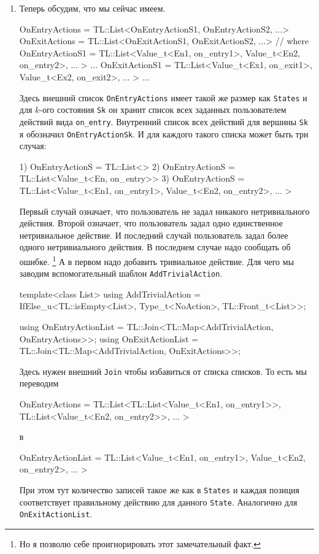 \documentclass{article}
\begin{document}
{\begin{enumerate}
\item Теперь обсудим, что мы сейчас имеем.
\begin{cppcode}[\nonumbers]
OnEntryActions = TL::List<OnEntryActionS1, OnEntryActionS2, ...>
OnExitActions =  TL::List<OnExitActionS1, OnExitActionS2, ...>
// where
OnEntryActionS1 = TL::List<Value_t<En1, on_entry1>,
                           Value_t<En2, on_entry2>,
                           ... >
...
OnExitActionS1 =  TL::List<Value_t<Ex1, on_exit1>,
                           Value_t<Ex2, on_exit2>,
                           ... >
...
\end{cppcode}
Здесь внешний список \verb"OnEntryActions" имеет такой же размер как \verb"States" и для $k$-ого состояния \verb"Sk" он хранит список всех заданных пользователем действий вида \verb"on_entry".
Внутренний список всех действий для вершины \verb"Sk" я обозначил \verb"OnEntryActionSk".
И для каждого такого списка может быть три случая:
\begin{cppcode}[\nonumbers]
1) OnEntryActionS = TL::List<>
2) OnEntryActionS = TL::List<Value_t<En, on_entry>>
3) OnEntryActionS = TL::List<Value_t<En1, on_entry1>,
                             Value_t<En2, on_entry2>,
                             ... >
\end{cppcode}
Первый случай означает, что пользователь не задал никакого нетривиального действия.
Второй означает, что пользователь задал одно единственное нетривиальное действие.
И последний случай пользователь задал более одного нетривиального действия.
В последнем случае надо сообщать об ошибке.%
\footnote{Но я позволю себе проигнорировать этот замечательный факт.}
А в первом надо добавить тривиальное действие.
Для чего мы заводим вспомогательный шаблон \verb"AddTrivialAction".
\begin{cppcode}[\nonumbers]
template<class List>
using AddTrivialAction = IfElse_u<TL::isEmpty<List>, Type_t<NoAction>, TL::Front_t<List>>;
\end{cppcode}

\begin{cppcode}[\nonumbers]
using OnEntryActionList = TL::Join<TL::Map<AddTrivialAction, OnEntryActions>>;
using OnExitActionList = TL::Join<TL::Map<AddTrivialAction, OnExitActions>>;
\end{cppcode}
Здесь нужен внешний \verb"Join" чтобы избавиться от списка списков.
То есть мы переводим
\begin{cppcode}[\nonumbers]
OnEntryActions = TL::List<TL::List<Value_t<En1, on_entry1>>,
                          TL::List<Value_t<En2, on_entry2>>,
                          ... >
\end{cppcode}
в
\begin{cppcode}[\nonumbers]
OnEntryActionList = TL::List<Value_t<En1, on_entry1>,
                             Value_t<En2, on_entry2>,
                             ... >
\end{cppcode}
При этом тут количество записей такое же как в \verb"States" и каждая позиция соответствует правильному действию для данного \verb"State".
Аналогично для \verb"OnExitActionList".


\end{enumerate}}
\end{document}
